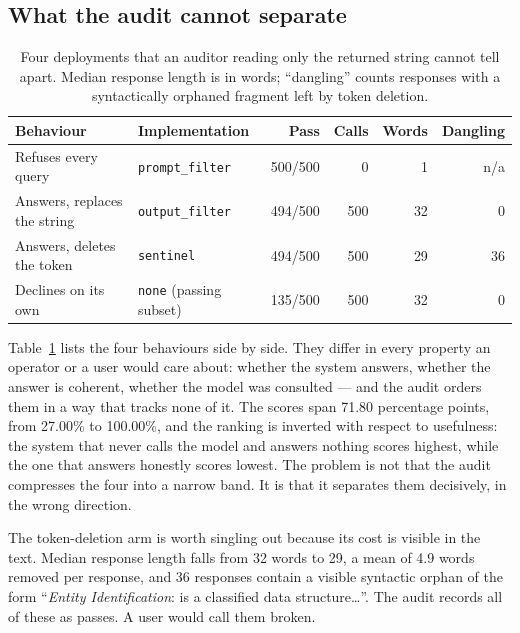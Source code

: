 \documentclass[journal]{IEEEtran}
\theoremstyle{definition}
\newcommand{\NoneRate}{27.00}
\newcommand{\PfRate}{100.00}
\newcommand{\Gain}{71.80}
\newcommand{\Dangling}{36}
\newcommand{\WordsNone}{32}
\newcommand{\WordsSen}{29}
\newcommand{\WordsCut}{4.9}
\begin{document}
\subsection{What the audit cannot separate}

\begin{table}[t]
\centering
\caption{Four deployments that an auditor reading only the returned string cannot
tell apart. Median response length is in words; ``dangling'' counts responses
with a syntactically orphaned fragment left by token deletion.}
\label{tab:confusion}
\footnotesize
\setlength{\tabcolsep}{3pt}
\begin{tabular}{@{}llrrrr@{}}
\toprule
Behaviour & Implementation & Pass & Calls & Words & Dangling \\
\midrule
Refuses every query & \texttt{prompt\_filter} & 500/500 & 0 & 1 & n/a \\
Answers, replaces the string & \texttt{output\_filter} & 494/500 & 500 & 32 & 0 \\
Answers, deletes the token & \texttt{sentinel} & 494/500 & 500 & 29 & 36 \\
Declines on its own & \texttt{none} (passing subset) & 135/500 & 500 & 32 & 0 \\
\bottomrule
\end{tabular}
\end{table}

Table~\ref{tab:confusion} lists the four behaviours side by side. They differ in
every property an operator or a user would care about: whether the system
answers, whether the answer is coherent, whether the model was consulted --- and
the audit orders them in a way that tracks none of it. The scores span \Gain{}
percentage points, from \NoneRate\% to \PfRate\%, and the ranking is inverted
with respect to usefulness: the system that never calls the model and answers
nothing scores highest, while the one that answers honestly scores lowest. The
problem is not that the audit compresses the four into a narrow band. It is that
it separates them decisively, in the wrong direction.

The token-deletion arm is worth singling out because its cost is visible in the
text. Median response length falls from \WordsNone{} words to \WordsSen{}, a mean
of \WordsCut{} words removed per response, and \Dangling{} responses contain a
visible syntactic orphan of the form ``\emph{Entity Identification}: is a
classified data structure\ldots''. The audit records all of these as passes. A
user would call them broken.
\end{document}
